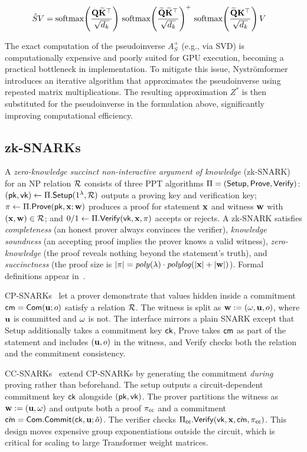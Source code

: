 \documentclass[runningheads]{llncs}
\begin{document}
\begin{align*}
\hat S V &=
{\mathrm{softmax}}\!\left(\frac{{\mathbf{Q}}\widetilde{{\mathbf{K}}}^{\top}}{\sqrt{d_k}}\right)
\,
{\mathrm{softmax}}\!\left(\frac{\widetilde{{\mathbf{Q}}}\widetilde{{\mathbf{K}}}^{\top}}{\sqrt{d_k}}\right)^{+}
\,
{\mathrm{softmax}}\!\left(\frac{\widetilde{{\mathbf{Q}}}{\mathbf{K}}^{\top}}{\sqrt{d_k}}\right)V
\end{align*}

The exact computation of the pseudoinverse $A_S^{+}$ (e.g., via SVD) is computationally expensive and poorly suited for GPU execution, becoming a practical bottleneck in implementation. To mitigate this issue, Nystr\"omformer introduces an iterative algorithm that approximates the pseudoinverse using repeated matrix multiplications. The resulting approximation $Z^*$ is then substituted for the pseudoinverse in the formulation above, significantly improving computational efficiency.

\subsection{zk-SNARKs}
A \textit{zero-knowledge succinct non-interactive argument of knowledge} (zk-SNARK) for an NP relation ${\mathcal{R}}$ consists of three PPT algorithms $\Pi=({\sf Setup},{\sf Prove},{\sf Verify})$: $({\sf pk},{\sf vk})\gets\Pi.{\sf Setup}(1^\lambda,{\mathcal{R}})$ outputs a proving key and verification key; $\pi\gets\Pi.{\sf Prove}({\sf pk},{\mathbf{x}};{\mathbf{w}})$ produces a proof for statement ${\mathbf{x}}$ and witness ${\mathbf{w}}$ with $({\mathbf{x}},{\mathbf{w}})\in{\mathcal{R}}$; and $0/1\gets\Pi.{\sf Verify}({\sf vk},{\mathbf{x}},\pi)$ accepts or rejects. A zk-SNARK satisfies \emph{completeness} (an honest prover always convinces the verifier), \emph{knowledge soundness} (an accepting proof implies the prover knows a valid witness), \emph{zero-knowledge} (the proof reveals nothing beyond the statement's truth), and \emph{succinctness} (the proof size is $|\pi|=\mathit{poly}(\lambda)\cdot\mathit{polylog}(|{\mathbf{x}}|+|{\mathbf{w}}|)$). Formal definitions appear in~\cite{Groth16}.

CP-SNARKs~\cite{Legosnark,Lunar} let a prover demonstrate that values hidden inside a commitment ${\sf cm}={\sf Com}({\mathbf{u}};o)$ satisfy a relation ${\mathcal{R}}$. The witness is split as ${\mathbf{w}}:=({\mathbf{\omega}},{\mathbf{u}},o)$, where ${\mathbf{u}}$ is committed and ${\mathbf{\omega}}$ is not. The interface mirrors a plain SNARK except that Setup additionally takes a commitment key ${\sf ck}$, Prove takes ${\sf cm}$ as part of the statement and includes $({\mathbf{u}},o)$ in the witness, and Verify checks both the relation and the commitment consistency.

CC-SNARKs~\cite{Legosnark,Vectis} extend CP-SNARKs by generating the commitment \emph{during} proving rather than beforehand. The setup outputs a circuit-dependent commitment key ${\sf ck}$ alongside $({\sf pk},{\sf vk})$. The prover partitions the witness as ${\mathbf{w}}:=({\mathbf{u}},{\mathbf{\omega}})$ and outputs both a proof $\pi_{\sf cc}$ and a commitment $\tilde{{\sf cm}}={\sf Com}.{\sf Commit}({\sf ck},{\mathbf{u}};\tilde{o})$. The verifier checks $\Pi_{\sf cc}.{\sf Verify}({\sf vk},{\mathbf{x}},\tilde{{\sf cm}},\pi_{\sf cc})$. This design moves expensive group exponentiations outside the circuit, which is critical for scaling to large Transformer weight matrices.
\end{document}
